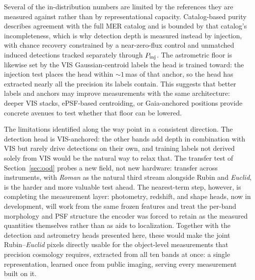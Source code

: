 \documentclass[twocolumn,linenumbers]{aastex701}
\begin{document}
Several of the in-distribution numbers are limited by the references they are measured against rather than by representational capacity. Catalog-based purity describes agreement with the full MER catalog and is bounded by that catalog's incompleteness, which is why detection depth is measured instead by injection, with chance recovery constrained by a near-zero-flux control and unmatched induced detections tracked separately through $P_{\rm inj}$. The astrometric floor is likewise set by the VIS Gaussian-centroid labels the head is trained toward: the injection test places the head within ${\sim}1$\,mas of that anchor, so the head has extracted nearly all the precision its labels contain. This suggests that better labels and anchors may improve measurements with the same architecture: deeper VIS stacks, ePSF-based centroiding, or Gaia-anchored positions provide concrete avenues to test whether that floor can be lowered.

The limitations identified along the way point in a consistent direction. The detection head is VIS-anchored: the other bands add depth in combination with VIS but rarely drive detections on their own, and training labels not derived solely from VIS would be the natural way to relax that. The transfer test of Section~\ref{sec:ood} probes a new field, not new hardware: transfer across instruments, with \textit{Roman} \citep{Spergel2015} as the natural third stream alongside Rubin and \textit{Euclid}, is the harder and more valuable test ahead. The nearest-term step, however, is completing the measurement layer: photometry, redshift, and shape heads, now in development, will work from the same frozen features and treat the per-band morphology and PSF structure the encoder was forced to retain as the measured quantities themselves rather than as aids to localization. Together with the detection and astrometry heads presented here, these would make the joint Rubin--\textit{Euclid} pixels directly usable for the object-level measurements that precision cosmology requires, extracted from all ten bands at once: a single representation, learned once from public imaging, serving every measurement built on it.
\end{document}

